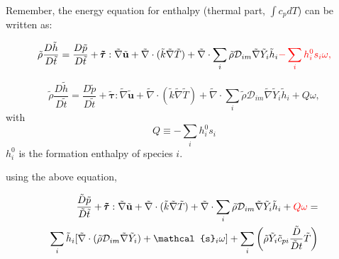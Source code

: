 \documentclass[preprint,12pt,authoryear]{elsarticle}
\begin{document}
Remember, the energy equation for enthalpy {\color{red} (thermal part, $\int c_pdT$) } can be written  as:

\begin{equation}
\begin{split}
        \tilde{\rho}\frac{D  \tilde{h}}{D\tilde{t}}
=
        \frac{D \tilde{p}}{D\tilde{t}}
+       
        \pmb{\tilde{\tau}}:\tilde{\nabla} \tilde{\mathbf{u}} 
+ 
        \tilde{\nabla} \cdot (\tilde{k}\tilde{\nabla} \tilde{T})
+
        \tilde{\nabla} \cdot
        \sum\limits_i 
        \tilde{\rho}\mathcal{D}_{im}\tilde{\nabla}\tilde{Y}_i     
        \tilde{h}_i
        {\color{red}
        -
        \sum_i h_i^0 s_i \omega,
        }
\end{split}
\end{equation}

{\color{red}
\[
       \tilde{\rho}\frac{D  \tilde{h}}{D\tilde{t}}
=
        \frac{D \tilde{p}}{D\tilde{t}}
+       
        \pmb{\tilde{\tau}}:\tilde{\nabla} \tilde{\mathbf{u}} 
+ 
        \tilde{\nabla} \cdot (\tilde{k}\tilde{\nabla} \tilde{T})
+
        \tilde{\nabla} \cdot
        \sum\limits_i 
        \tilde{\rho}\mathcal{D}_{im}\tilde{\nabla}\tilde{Y}_i     
        \tilde{h}_i
        +
        Q\omega,
\]
with
\[
   Q \equiv -\sum_i h_i^0 s_i 
\]
$h_i^0$ is the formation enthalpy of species $i$.
}





using the above equation, 

\begin{equation}
\begin{split}
        \frac{\tilde{D} \tilde{p}}{\tilde{D}\tilde{t}}
        +       
        \pmb{\tilde{\tau}}:\tilde{\nabla} \tilde{\mathbf{u}} 
        + 
        \tilde{\nabla} \cdot (\tilde{k}\tilde{\nabla} \tilde{T})
        +
        \tilde{\nabla} \cdot
        \sum\limits_i 
        \tilde{\rho}\mathcal{D}_{im}\tilde{\nabla}\tilde{Y}_i     
        \tilde{h}_i
        +
        {\color{red} Q\omega}
        =
	\\
        \sum\limits_i
                \tilde{h}_i
                [
                	\tilde{\nabla}\cdot
			(
			\tilde{\rho}\mathcal{D}_{im}\tilde{\nabla}\tilde{Y}_i
			)
			+
        	\mathcal{s}_i \omega
		]
        +
        \sum\limits_i
        \left(
                \tilde{\rho}
                \tilde{Y}_i
                \tilde{c}_{pi}
                \frac{\tilde{D}}{\tilde{D} t}
                \tilde{T}
        \right)
\end{split}
\end{equation}
\end{document}
